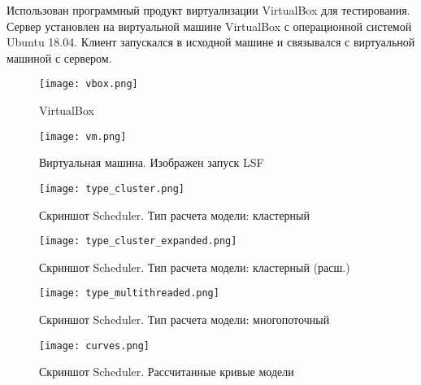 Использован программный продукт виртуализации VirtualBox для тестирования. Сервер установлен на виртуальной машине VirtualBox с операционной системой Ubuntu 18.04. Клиент запускался в исходной машине и связывался с виртуальной машиной с сервером.

\begin{figure}[h]
    \centering
    \texttt{[image: vbox.png]}
    \caption{VirtualBox}
\end{figure}

\begin{figure}[h]
    \centering
    \texttt{[image: vm.png]}
    \caption{Виртуальная машина. Изображен запуск LSF}
\end{figure}

\begin{figure}[h]
    \centering
    \texttt{[image: type\_cluster.png]}
    \caption{Скриншот Scheduler. Тип расчета модели: кластерный}
\end{figure}

\begin{figure}[h]
    \centering
    \texttt{[image: type\_cluster\_expanded.png]}
    \caption{Скриншот Scheduler. Тип расчета модели: кластерный (расш.)}
\end{figure}

\begin{figure}[h]
    \centering
    \texttt{[image: type\_multithreaded.png]}
    \caption{Скриншот Scheduler. Тип расчета модели: многопоточный}
\end{figure}

\begin{figure}[h]
    \centering
    \texttt{[image: curves.png]}
    \caption{Скриншот Scheduler. Рассчитанные кривые модели}
\end{figure}

\clearpage